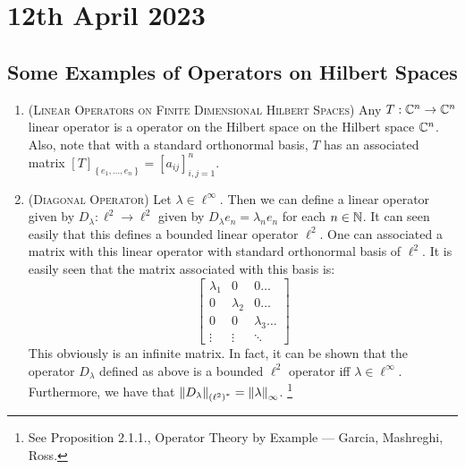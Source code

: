 \section{12th April 2023}

\horz 

\subsection{Some Examples of Operators on Hilbert Spaces}

\begin{enumerate}
    \item (\textsc{Linear Operators on Finite Dimensional Hilbert Spaces}) Any $T: \mathbb C ^n \to \mathbb C ^n$ linear operator is a operator on the Hilbert space on the Hilbert space $\mathbb C ^{n}$. Also, note that with a standard orthonormal basis, $T$ has an associated matrix $\left[ T \right]_{\left\{ e_{1}, \ldots , e_{n} \right\}} = \left[ a_{ij} \right]_{i,j=1}^{n}$.

    \item (\textsc{Diagonal Operator}) Let $\lambda \in \ell ^{\infty} $. Then we can define a linear operator given by $D_{\lambda}: \ell ^{2} \to \ell ^{2}$ given by $D_{\lambda} e_{n} = \lambda_{n}e_{n}$ for each $n\in \mathbb N$. It can seen easily that this defines a bounded linear operator $\ell ^{2}$. One can associated a matrix with this linear operator with standard orthonormal basis of $\ell ^{2}$. It is easily seen that the matrix associated with this basis is:
	\begin{equation*}
	    \begin{bmatrix}
		\lambda_{1} & 0 & 0 \ldots \\
		0 & \lambda_{2} & 0 \ldots \\ 
		0 & 0 & \lambda_{3} \ldots \\
		\vdots & \vdots & \ddots 
	    \end{bmatrix}
	\end{equation*}
	This obviously is an infinite matrix. In fact, it can be shown that the operator $D_{\lambda}$ defined as above is a bounded $\ell ^{2}$ operator iff $\lambda \in \ell ^{\infty}$. Furthermore, we have that $\left\lVert D_{\lambda} \right\rVert_{\left( \ell ^{2} \right)^{*}} = \left\lVert \lambda \right\rVert_{\infty}$. \footnote{See Proposition 2.1.1., Operator Theory by Example --- Garcia, Mashreghi, Ross.}


\end{enumerate}
